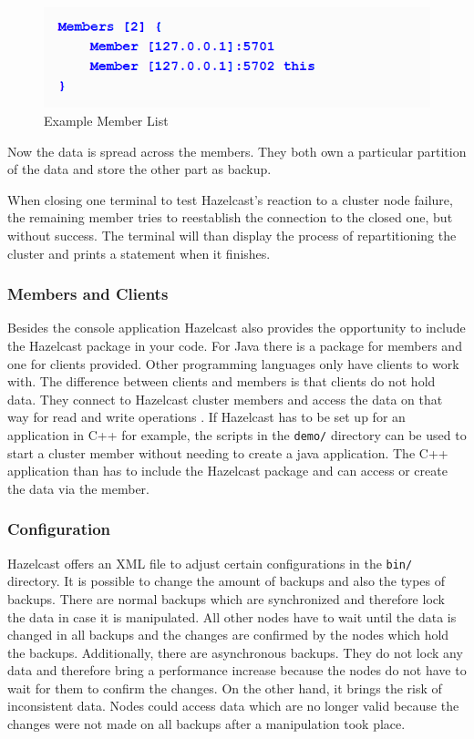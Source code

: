 \begin{flushleft}
\begin{figure}[h]
    \includegraphics{img/hazelcastMembers.PNG}
    \caption{Example Member List \parencite{johns2015}}
\end{figure}
\end{flushleft}
Now the data is spread across the members. They both own a particular partition of the data and store the other part as backup.

When closing one terminal to test Hazelcast's reaction to a cluster node failure, the remaining member tries to reestablish the connection to the closed one, but without success. The terminal will than display the process of repartitioning the cluster and prints a statement when it finishes.
\subsubsection*{Members and Clients}
Besides the console application Hazelcast also provides the opportunity to include the Hazelcast package in your code. For Java there is a package for members and one for clients provided. Other programming languages only have clients to work with. The difference between clients and members is that clients do not hold data. They connect to Hazelcast cluster members and access the data on that way for read and write operations \parencite{hazelcastmanual}. If Hazelcast has to be set up for an application in C++ for example, the scripts in the \texttt{demo/} directory can be used to start a cluster member without needing to create a java application. The C++ application than has to include the Hazelcast package and can access or create the data via the member.
\subsubsection*{Configuration}
Hazelcast offers an XML file to adjust certain configurations in the \texttt{bin/} directory.
It is possible to change the amount of backups and also the types of backups. There are normal backups which are synchronized and therefore lock the data in case it is manipulated. All other nodes have to wait until the data is changed in all backups and the changes are confirmed by the nodes which hold the backups. Additionally, there are asynchronous backups. They do not lock any data and therefore bring a performance increase because the nodes do not have to wait for them to confirm the changes. On the other hand, it brings the risk of inconsistent data. Nodes could access data which are no longer valid because the changes were not made on all backups after a manipulation took place.

